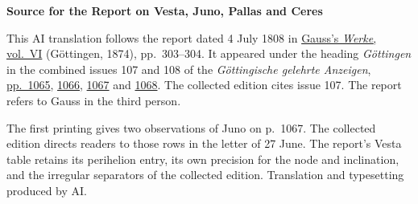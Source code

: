 \clearpage\thispagestyle{empty}
\begin{center}\textbf{Source for the Report on Vesta, Juno, Pallas and Ceres}\end{center}
\noindent This AI translation follows the report dated 4 July 1808 in \href{https://gdz.sub.uni-goettingen.de/id/PPN236007467}{Gauss’s \textit{Werke}, vol.~VI} (Göttingen, 1874), pp.~303--304. It appeared under the heading \textit{Göttingen} in the combined issues 107 and 108 of the \textit{Göttingische gelehrte Anzeigen}, \href{https://manifests.sub.uni-goettingen.de/iiif/image/gdz:PPN319721507_1808:00001071/full/1600,/0/default.jpg}{pp.~1065}, \href{https://manifests.sub.uni-goettingen.de/iiif/image/gdz:PPN319721507_1808:00001072/full/1600,/0/default.jpg}{1066}, \href{https://manifests.sub.uni-goettingen.de/iiif/image/gdz:PPN319721507_1808:00001073/full/1600,/0/default.jpg}{1067} and \href{https://manifests.sub.uni-goettingen.de/iiif/image/gdz:PPN319721507_1808:00001074/full/1600,/0/default.jpg}{1068}. The collected edition cites issue 107. The report refers to Gauss in the third person.
\par\medskip
The first printing gives two observations of Juno on p.~1067. The collected edition directs readers to those rows in the letter of 27 June. The report’s Vesta table retains its perihelion entry, its own precision for the node and inclination, and the irregular separators of the collected edition. Translation and typesetting produced by AI.
\clearpage
